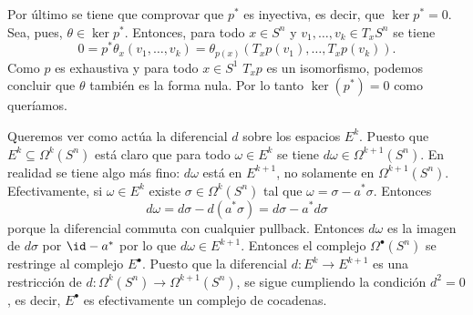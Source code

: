 \documentclass[12pt]{article}
\begin{document}
Por último se tiene que comprovar que \( p^\ast \) es inyectiva, es decir, que \( \ker
p^\ast = 0 \). Sea, pues, \( \theta \in \ker p^\ast \). Entonces, para todo \( x \in S^n
\) y \( v_1, \dots, v_k \in T_xS^n \) se tiene
\begin{equation*}
	0 = p^\ast \theta_x(v_1, \dots, v_k) = \theta_{p(x)}(T_xp(v_1), \dots, T_xp(v_k)).
\end{equation*}
Como \( p \) es exhaustiva y para todo \( x \in S^1 \) \( T_xp \) es un isomorfismo,
podemos concluir que \( \theta \) también es la forma nula. Por lo tanto \( \ker(p^\ast) =
0 \) como queríamos.

\parbreak

Queremos ver como actúa la diferencial \( d \) sobre los espacios \( E^k \). Puesto que \(
E^k \subseteq \Omega^k(S^n) \) está claro que para todo \( \omega \in E^k \) se tiene \(
d\omega \in \Omega^{k+1}(S^n) \). En realidad se tiene algo más fino: \( d\omega \) está
en \( E^{k+1} \), no solamente en \( \Omega^{k+1}(S^n) \). Efectivamente, si \( \omega \in
E^k \) existe \( \sigma \in \Omega^k(S^n) \) tal que \( \omega = \sigma - a^\ast \sigma
\). Entonces
\begin{equation*}
	d\omega = d\sigma - d(a^\ast \sigma) = d\sigma - a^\ast d\sigma
\end{equation*}
porque la diferencial commuta con cualquier pullback. Entonces \( d\omega \) es la imagen
de \( d\sigma \) por \( \id - a^\ast \) por lo que \( d\omega \in E^{k+1} \). Entonces el
complejo \( \Omega^{\bullet}(S^n) \) se restringe al complejo \( E^\bullet \). Puesto que
la diferencial \( d \colon E^k \to E^{k+1} \) es una restricción de \( d \colon
\Omega^{k}(S^n) \to \Omega^{k+1}(S^n) \), se sigue cumpliendo la condición \( d^2 = 0 \),
es decir, \( E^\bullet \) es efectivamente un complejo de cocadenas.

\parbreak
\end{document}
